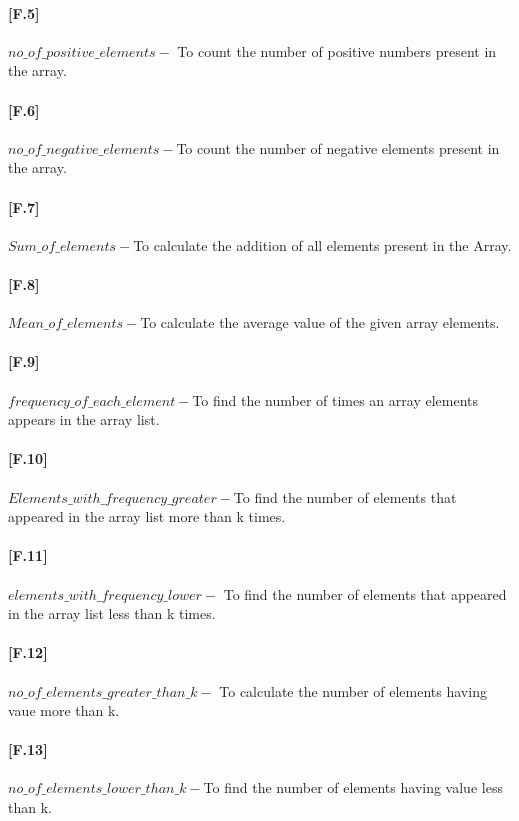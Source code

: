 \documentclass[12pt,a4paper]{article}
\begin{document}
\paragraph{[F.5]}$no\_of\_positive\_elements-$ To count the number of positive numbers present in the array.
\\
\paragraph{[F.6]}$no\_of\_negative\_elements-$To count the number of negative elements present in the array.
\\
\paragraph{[F.7]}$Sum\_of\_elements-$To calculate the addition of all elements present in the Array.
\\
\paragraph{[F.8]}$Mean\_of\_elements-$To calculate the average value of the given array elements.
\\
\paragraph{[F.9]}$frequency\_of\_each\_element-$To find the number of times an array elements appears in the array list.
\\
\paragraph{[F.10]}$Elements\_with\_frequency\_greater-$To find the number of elements that appeared in the array list more than k times.
\\
\paragraph{[F.11]}$elements\_with\_frequency\_lower-$ To find the number of elements that appeared in the array list less than k times.
\\
\paragraph{[F.12]}$no\_of\_elements\_greater\_than\_k-$ To calculate the number of elements having vaue more than k.
\\
\paragraph{[F.13]}$no\_of\_elements\_lower\_than\_k-$To find the number of elements having value less than k.
\\
\end{document}
